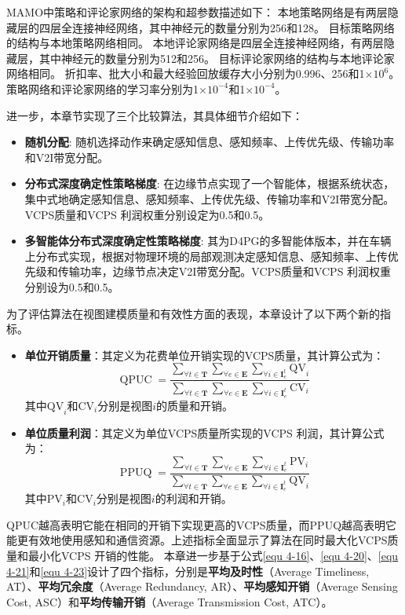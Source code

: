 MAMO中策略和评论家网络的架构和超参数描述如下：
本地策略网络是有两层隐藏层的四层全连接神经网络，其中神经元的数量分别为256和128。
目标策略网络的结构与本地策略网络相同。
本地评论家网络是四层全连接神经网络，有两层隐藏层，其中神经元的数量分别为512和256。
目标评论家网络的结构与本地评论家网络相同。
折扣率、批大小和最大经验回放缓存大小分别为0.996、256和1$\times10^{6}$。
策略网络和评论家网络的学习率分别为1$\times10^{-4}$和1$\times10^{-4}$。

进一步，本章节实现了三个比较算法，其具体细节介绍如下：
\begin{itemize}
	\item \textbf{随机分配}: 随机选择动作来确定感知信息、感知频率、上传优先级、传输功率和V2I带宽分配。
	\item \textbf{分布式深度确定性策略梯度}\cite{barth2018distributed}: 在边缘节点实现了一个智能体，根据系统状态，集中式地确定感知信息、感知频率、上传优先级、传输功率和V2I带宽分配。VCPS质量和VCPS 利润权重分别设定为0.5和0.5。
	\item \textbf{多智能体分布式深度确定性策略梯度}: 其为D4PG的多智能体版本，并在车辆上分布式实现，根据对物理环境的局部观测决定感知信息、感知频率、上传优先级和传输功率，边缘节点决定V2I带宽分配。VCPS质量和VCPS 利润权重分别设为0.5和0.5。
\end{itemize}

为了评估算法在视图建模质量和有效性方面的表现，本章设计了以下两个新的指标。
\begin{itemize}
	\item \textbf{单位开销质量}：其定义为花费单位开销实现的VCPS质量，其计算公式为：
		\begin{equation}
			\operatorname{QPUC}=\frac{\sum_{\forall t \in \mathbf{T}} \sum_{\forall e \in \mathbf{E}} \sum_{\forall i \in \mathbf{I}_e^t} \mathrm{QV}_i}{\sum_{\forall t \in \mathbf{T}} \sum_{\forall e \in \mathbf{E}} \sum_{\forall i \in \mathbf{I}_e^t} \mathrm{CV}_i}
		\end{equation}
		其中$\mathrm{QV}_i$和$\mathrm{CV}_i$分别是视图$i$的质量和开销。
	\item \textbf{单位质量利润}：其定义为单位VCPS质量所实现的VCPS 利润，其计算公式为：
		\begin{equation}
		\operatorname{PPUQ}=\frac{\sum_{\forall t \in \mathbf{T}} \sum_{\forall e \in \mathbf{E}} \sum_{\forall i \in \mathbf{I}_e^t}\mathrm{PV}_i}{\sum_{\forall t \in \mathbf{T}} \sum_{\forall e \in \mathbf{E}} \sum_{\forall i \in \mathbf{I}_e^t} \mathrm{QV}_i}
		\end{equation}
		其中$\mathrm{PV}_i$和$\mathrm{CV}_i$分别是视图$i$的利润和开销。
\end{itemize}
QPUC越高表明它能在相同的开销下实现更高的VCPS质量，而PPUQ越高表明它能更有效地使用感知和通信资源。上述指标全面显示了算法在同时最大化VCPS质量和最小化VCPS 开销的性能。
本章进一步基于公式\ref{equ 4-16}、\ref{equ 4-20}、\ref{equ 4-21}和\ref{equ 4-23}设计了四个指标，分别是\textbf{平均及时性}（Average Timeliness, AT）、\textbf{平均冗余度}（Average Redundancy, AR）、\textbf{平均感知开销}（Average Sensing Cost, ASC）和\textbf{平均传输开销}（Average Transmission Cost, ATC）。 


